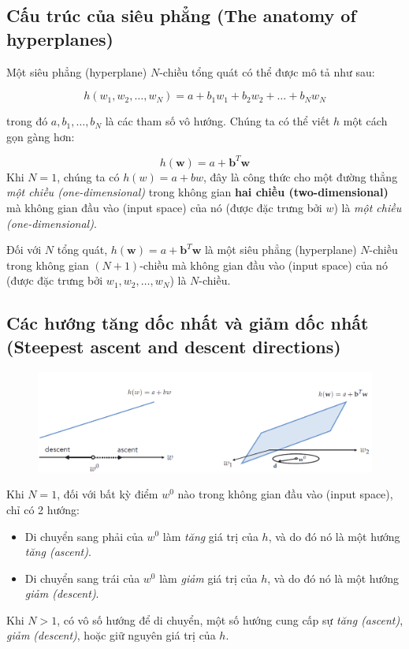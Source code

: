 \documentclass{book}
\begin{document}
\subsection{Cấu trúc của siêu phẳng (The anatomy of hyperplanes)}
Một siêu phẳng (hyperplane) $N$-chiều tổng quát có thể được mô tả như sau:
    
\begin{equation*}
    h(w_1,w_2,\ldots,w_N)=a+b_1 w_1 + b_2 w_2 + \ldots + b_N w_N
\end{equation*}

trong đó $a, b_1, \ldots, b_N$ là các tham số vô hướng. Chúng ta có thể viết $h$ một cách gọn gàng hơn:

\begin{equation*}
    h(\mathbf{w})=a+\mathbf{b}^T\mathbf{w}
\end{equation*}
Khi $N=1$, chúng ta có $h(w)=a+bw$, đây là công thức cho một đường thẳng \textit{một chiều (one-dimensional)} trong không gian \textbf{hai chiều (two-dimensional)} mà không gian đầu vào (input space) của nó (được đặc trưng bởi $w$) là \textit{một chiều (one-dimensional)}.

Đối với $N$ tổng quát, $h(\mathbf{w})=a+\mathbf{b}^T\mathbf{w}$ là một siêu phẳng (hyperplane) $N$-chiều trong không gian $(N+1)$-chiều mà không gian đầu vào (input space) của nó (được đặc trưng bởi $w_1,w_2,\ldots,w_N$) là $N$-chiều.
\subsection{Các hướng tăng dốc nhất và giảm dốc nhất (Steepest ascent and descent directions)}
\begin{figure}[H]
    \centering
    \includegraphics[width=\textwidth]{images/steepest_ascent_and_steepest_descent.png}
\end{figure}

Khi $N=1$, đối với bất kỳ điểm $w^0$ nào trong không gian đầu vào (input space), chỉ có 2 hướng:

\begin{itemize}
    \item Di chuyển sang phải của $w^0$ làm \textit{tăng} giá trị của $h$, và do đó nó là một hướng \textit{tăng (ascent)}.
    \item Di chuyển sang trái của $w^0$ làm \textit{giảm} giá trị của $h$, và do đó nó là một hướng \textit{giảm (descent)}.
\end{itemize}
Khi $N>1$, có vô số hướng để di chuyển, một số hướng cung cấp sự \textit{tăng (ascent)}, \textit{giảm (descent)}, hoặc giữ nguyên giá trị của $h$.
\end{document}
